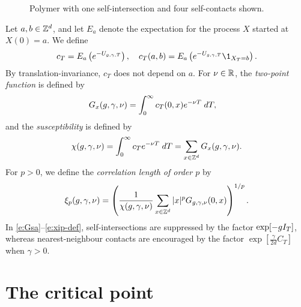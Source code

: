 \begin{figure}[ht]
 \centering
 \caption{Polymer with one self-intersection and four self-contacts shown.}
 \label{fig:polymer-contact}
\end{figure}

Let $a,b \in { {{\mathbb Z}}^d }$, and
let $E_a$ denote the expectation for the
process $X$ started at $X(0)=a$.
We define
\begin{equation}
\label{e:c}
    c_T = E_a\left(e^{-U_{\gcc,\gamma,T}}\right),
    \quad
    c_T(a,b) = E_a\left(e^{-U_{\gcc,\gamma,T}}\1_{X_T = b}\right).
\end{equation}
By translation-invariance, $c_T$ does not depend on $a$.
For $\nu \in {\mathbb R}$, the \emph{two-point function} is defined by
\begin{align}
\lbeq{Gsa}
    G_x(\gcc,\gamma,\nu) &=
    \int_0^\infty c_T(0, x) e^{-\nu T} \; dT,
\end{align}
and the \emph{susceptibility} is defined by
\begin{equation}
\label{e:suscept-def}
    \chi(g, \gamma, \nu)
    = \int_0^\infty c_T e^{-\nu T} \; dT
    = \sum_{x\in{ {{\mathbb Z}}^d }} G_x(g,\gamma,\nu)
    .
\end{equation}
For $p>0$, we define the \emph{correlation length of order $p$} by
\begin{equation}
\lbeq{xip-def}
    \xi_p(\gcc,\gamma,\nu) = \left(\frac{1}{\chi(\gcc, \gamma, \nu)}
    \sum_{x\in\Zd} |x|^p G_{\gcc,\gamma,\nu}(0, x)
    \right)^{1/p}.
\end{equation}
In \eqref{e:Gsa}--\eqref{e:xip-def},
self-intersections are suppressed by the factor
$\exp[-g I_T]$, whereas nearest-neighbour
contacts are encouraged by the factor
$\exp[\frac{\gamma}{2d}C_T]$ when $\gamma > 0$.


\section{The critical point}


